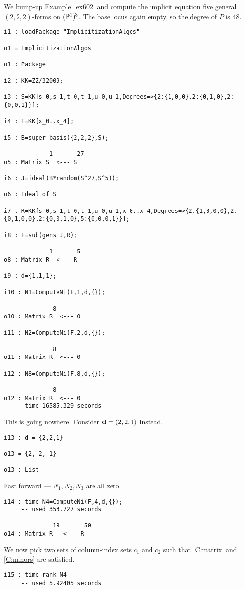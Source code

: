 \documentclass[fleqn,reqno]{amsart}
\begin{document}
\begin{example}[$\mt{ex603}$]
\label{ex603}
We bump-up Example~\ref{ex602} and compute the implicit equation five general
$(2,2,2)$-forms on $(\mathbb{P}^1)^3$. The base locus again empty, so the degree of $P$ is 48.
\begin{verbatim}
i1 : loadPackage "ImplicitizationAlgos"

o1 = ImplicitizationAlgos

o1 : Package

i2 : KK=ZZ/32009;

i3 : S=KK[s_0,s_1,t_0,t_1,u_0,u_1,Degrees=>{2:{1,0,0},2:{0,1,0},2:{0,0,1}}];

i4 : T=KK[x_0..x_4];

i5 : B=super basis({2,2,2},S);

             1       27
o5 : Matrix S  <--- S

i6 : J=ideal(B*random(S^27,S^5));

o6 : Ideal of S

i7 : R=KK[s_0,s_1,t_0,t_1,u_0,u_1,x_0..x_4,Degrees=>{2:{1,0,0,0},2:{0,1,0,0},2:{0,0,1,0},5:{0,0,0,1}}];

i8 : F=sub(gens J,R);

             1       5
o8 : Matrix R  <--- R

i9 : d={1,1,1};

i10 : N1=ComputeNi(F,1,d,{});

              8
o10 : Matrix R  <--- 0

i11 : N2=ComputeNi(F,2,d,{});

              8
o11 : Matrix R  <--- 0

i12 : N8=ComputeNi(F,8,d,{});

              8
o12 : Matrix R  <--- 0
   -- time 16585.329 seconds
\end{verbatim}
This is going nowhere.
Consider $\mathbf d=(2,2,1)$ instead.
\begin{verbatim}
i13 : d = {2,2,1}

o13 = {2, 2, 1}

o13 : List
\end{verbatim}
Fast forward --- $N_1, N_2, N_3$ are all zero.
\begin{verbatim}
i14 : time N4=ComputeNi(F,4,d,{});
     -- used 353.727 seconds

              18       50
o14 : Matrix R   <--- R
\end{verbatim}
We now pick two sets of column-index sets $c_1$ and $c_2$ such that
\eqref{C:matrix} and \eqref{C:minors} are satisfied.
\begin{verbatim}
i15 : time rank N4
     -- used 5.92405 seconds


\end{verbatim}
\end{example}
\end{document}
